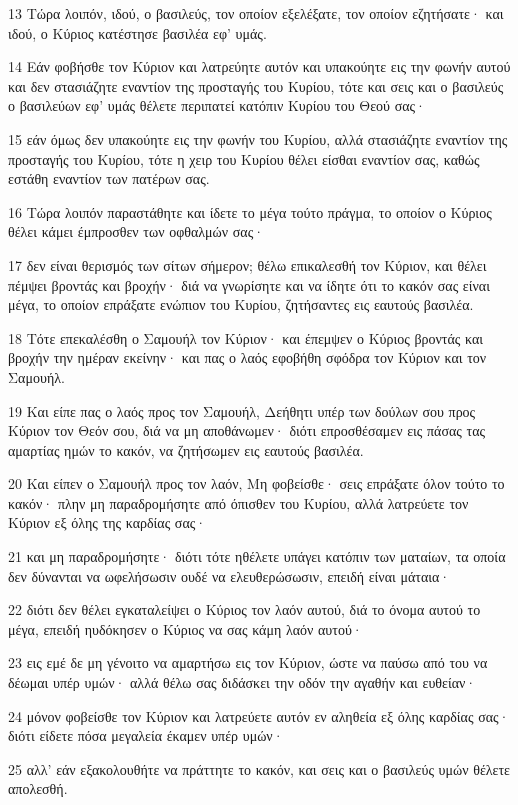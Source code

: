 \par 13 Τώρα λοιπόν, ιδού, ο βασιλεύς, τον οποίον εξελέξατε, τον οποίον εζητήσατε· και ιδού, ο Κύριος κατέστησε βασιλέα εφ' υμάς.
\par 14 Εάν φοβήσθε τον Κύριον και λατρεύητε αυτόν και υπακούητε εις την φωνήν αυτού και δεν στασιάζητε εναντίον της προσταγής του Κυρίου, τότε και σεις και ο βασιλεύς ο βασιλεύων εφ' υμάς θέλετε περιπατεί κατόπιν Κυρίου του Θεού σας·
\par 15 εάν όμως δεν υπακούητε εις την φωνήν του Κυρίου, αλλά στασιάζητε εναντίον της προσταγής του Κυρίου, τότε η χειρ του Κυρίου θέλει είσθαι εναντίον σας, καθώς εστάθη εναντίον των πατέρων σας.
\par 16 Τώρα λοιπόν παραστάθητε και ίδετε το μέγα τούτο πράγμα, το οποίον ο Κύριος θέλει κάμει έμπροσθεν των οφθαλμών σας·
\par 17 δεν είναι θερισμός των σίτων σήμερον; θέλω επικαλεσθή τον Κύριον, και θέλει πέμψει βροντάς και βροχήν· διά να γνωρίσητε και να ίδητε ότι το κακόν σας είναι μέγα, το οποίον επράξατε ενώπιον του Κυρίου, ζητήσαντες εις εαυτούς βασιλέα.
\par 18 Τότε επεκαλέσθη ο Σαμουήλ τον Κύριον· και έπεμψεν ο Κύριος βροντάς και βροχήν την ημέραν εκείνην· και πας ο λαός εφοβήθη σφόδρα τον Κύριον και τον Σαμουήλ.
\par 19 Και είπε πας ο λαός προς τον Σαμουήλ, Δεήθητι υπέρ των δούλων σου προς Κύριον τον Θεόν σου, διά να μη αποθάνωμεν· διότι επροσθέσαμεν εις πάσας τας αμαρτίας ημών το κακόν, να ζητήσωμεν εις εαυτούς βασιλέα.
\par 20 Και είπεν ο Σαμουήλ προς τον λαόν, Μη φοβείσθε· σεις επράξατε όλον τούτο το κακόν· πλην μη παραδρομήσητε από όπισθεν του Κυρίου, αλλά λατρεύετε τον Κύριον εξ όλης της καρδίας σας·
\par 21 και μη παραδρομήσητε· διότι τότε ηθέλετε υπάγει κατόπιν των ματαίων, τα οποία δεν δύνανται να ωφελήσωσιν ουδέ να ελευθερώσωσιν, επειδή είναι μάταια·
\par 22 διότι δεν θέλει εγκαταλείψει ο Κύριος τον λαόν αυτού, διά το όνομα αυτού το μέγα, επειδή ηυδόκησεν ο Κύριος να σας κάμη λαόν αυτού·
\par 23 εις εμέ δε μη γένοιτο να αμαρτήσω εις τον Κύριον, ώστε να παύσω από του να δέωμαι υπέρ υμών· αλλά θέλω σας διδάσκει την οδόν την αγαθήν και ευθείαν·
\par 24 μόνον φοβείσθε τον Κύριον και λατρεύετε αυτόν εν αληθεία εξ όλης καρδίας σας· διότι είδετε πόσα μεγαλεία έκαμεν υπέρ υμών·
\par 25 αλλ' εάν εξακολουθήτε να πράττητε το κακόν, και σεις και ο βασιλεύς υμών θέλετε απολεσθή.

